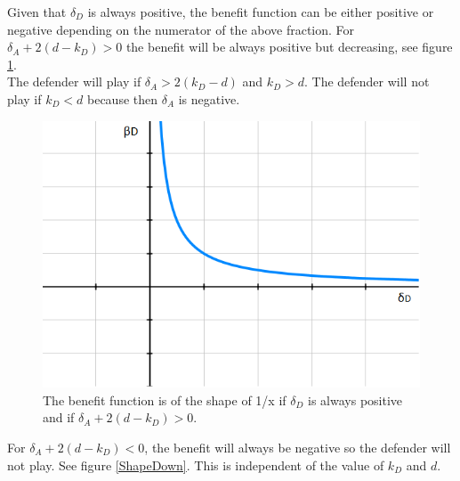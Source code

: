 Given that $\delta_{D}$ is always positive, the benefit function can be either positive or negative depending on the numerator of the above fraction. For $\delta_{A} + 2(d-k_{D}) > 0$ the benefit will be always positive but decreasing, see figure \ref{ShapeUp}. \\
The defender will play if $ \delta_{A} > 2(k_{D} -d)$ and $k_{D} > d$. The defender will not play if $k_{D} < d$ because then $ \delta_{A}$ is negative.\\
\begin{figure}
\centering
\includegraphics[scale=0.5]{Images/ShapesUp.png} 
\caption{The benefit function is of the shape of 1/x if $\delta_{D}$ is always positive and if $\delta_{A} + 2(d-k_{D}) > 0$. }
\label{ShapeUp}
\end{figure}

For $\delta_{A} + 2(d-k_{D}) < 0$, the benefit will always be negative so the defender will not play. See figure \ref{ShapeDown}. This is independent of the value of $k_{D}$ and $ d$. 

